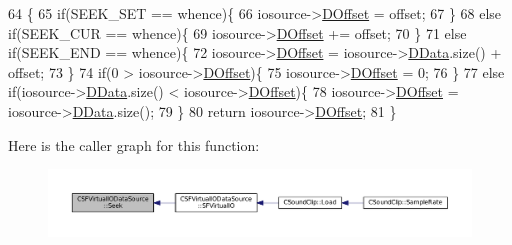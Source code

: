 \begin{DoxyCode}
64                                                                                                       \{
65     \textcolor{keywordflow}{if}(SEEK\_SET == whence)\{
66         iosource->\hyperlink{classCSFVirtualIODataSource_a29db7bf8a3a7103deacb80bf619919c8}{DOffset} = offset;
67     \}
68     \textcolor{keywordflow}{else} \textcolor{keywordflow}{if}(SEEK\_CUR == whence)\{
69         iosource->\hyperlink{classCSFVirtualIODataSource_a29db7bf8a3a7103deacb80bf619919c8}{DOffset} += offset;
70     \}
71     \textcolor{keywordflow}{else} \textcolor{keywordflow}{if}(SEEK\_END == whence)\{
72         iosource->\hyperlink{classCSFVirtualIODataSource_a29db7bf8a3a7103deacb80bf619919c8}{DOffset} = iosource->\hyperlink{classCSFVirtualIODataSource_ac03be5c46b6647150e12edc04fa52ede}{DData}.size() + offset;        
73     \}
74     \textcolor{keywordflow}{if}(0 > iosource->\hyperlink{classCSFVirtualIODataSource_a29db7bf8a3a7103deacb80bf619919c8}{DOffset})\{
75         iosource->\hyperlink{classCSFVirtualIODataSource_a29db7bf8a3a7103deacb80bf619919c8}{DOffset} = 0;    
76     \}
77     \textcolor{keywordflow}{else} \textcolor{keywordflow}{if}(iosource->\hyperlink{classCSFVirtualIODataSource_ac03be5c46b6647150e12edc04fa52ede}{DData}.size() < iosource->\hyperlink{classCSFVirtualIODataSource_a29db7bf8a3a7103deacb80bf619919c8}{DOffset})\{
78         iosource->\hyperlink{classCSFVirtualIODataSource_a29db7bf8a3a7103deacb80bf619919c8}{DOffset} = iosource->\hyperlink{classCSFVirtualIODataSource_ac03be5c46b6647150e12edc04fa52ede}{DData}.size();
79     \}
80     \textcolor{keywordflow}{return} iosource->\hyperlink{classCSFVirtualIODataSource_a29db7bf8a3a7103deacb80bf619919c8}{DOffset};
81 \}
\end{DoxyCode}
Here is the caller graph for this function\+:\nopagebreak
\begin{figure}[H]
\begin{center}
\leavevmode
\includegraphics[width=350pt]{classCSFVirtualIODataSource_a04735e135ffc05dd53fce944e772fcfc_icgraph}
\end{center}
\end{figure}
\hypertarget{classCSFVirtualIODataSource_a9c15fbbe734fdfc2af17ca8f424b7e43}{}\label{classCSFVirtualIODataSource_a9c15fbbe734fdfc2af17ca8f424b7e43} 
